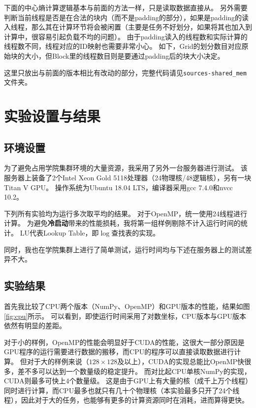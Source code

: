 \documentclass[logo,reportComp]{thesis}
\def\sharedmem{\textcolor{red}{\kaiti 共享内存}}
\begin{document}
下面的中心熵计算逻辑基本与前面的方法一样，只是读取数据直接从。
另外需要判断当前线程是否是在合法的块内（而不是padding的部分），如果是padding的读入线程，那么其在计算环节将会被闲置（主要是任务不好划分，如果将其也加入到计算中，很容易引起负载不均的问题）。
由于padding读入的线程数和实际计算的线程数不同，线程对应的ID映射也需要非常小心。
如下，Grid的划分数目对应原始块的大小，但Block里的线程数目则是要通过padding后的块大小决定。


这里只放出与前面的版本相比有改动的部分，完整代码请见\verb'sources-shared_mem'文件夹。


\section{实验设置与结果}
\label{sec:exp}
\subsection{环境设置}
为了避免占用学院集群环境的大量资源，我采用了另外一台服务器进行测试。
该服务器上装备了2个Intel Xeon Gold 5118处理器（24物理核/48逻辑核），另有一块Titan V GPU。
操作系统为Ubuntu 18.04 LTS，编译器采用gcc 7.4.0和nvcc 10.2。

下列所有实验均为运行多次取平均的结果。
对于OpenMP，统一使用24线程进行计算。
为避免\textbf{冷启动}带来的性能损耗，我将第一组样例剔除不计入运行时间的统计。
LU代表Lookup Table，即$\log$查找表的实现。

同时，我也在学院集群上进行了简单测试，运行时间均与下述在服务器上的测试差异不大。

\subsection{实验结果}
\label{sub:exp}
首先我比较了CPU两个版本（NumPy、OpenMP）和GPU版本的性能，结果如图\ref{fig:cpu}所示。
可以看到，即使运行时间采用了对数坐标，CPU版本与GPU版本依然有明显的差距。

对于小的样例，OpenMP的性能会明显好于CUDA的性能，这很大一部分原因是GPU程序的运行需要进行数据的搬移，而CPU的程序可以直接读取数据进行计算。
但对于大的样例来说（$128\times 128$及以上），CUDA的实现总能比OpenMP快很多，差不多可以达到一个数量级的稳定提升。
而对比起CPU单核NumPy的实现，CUDA则最多可快上4个数量级。
这是由于GPU上有大量的核（成千上万个线程）同时进行计算，而CPU最多也就只有几十个物理核（本实验最多只开了24个线程），因此对于大的任务，也能够有更多的计算资源同时在消耗，进而算得更快。
\end{document}
